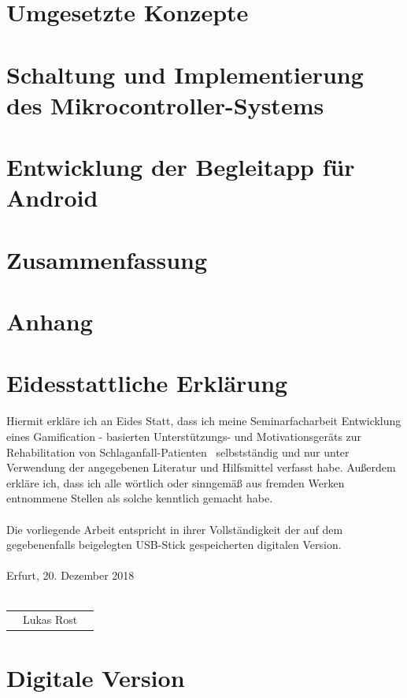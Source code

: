 \documentclass[a4paper, 11pt, titlepage, bibliography=totocnumbered]{scrartcl}
\begin{document}
\newpage
\section{Umgesetzte Konzepte}


\newpage
\section{Schaltung und Implementierung des Mikrocontroller-Systems}


\newpage
\section{Entwicklung der Begleitapp für Android}


\newpage
\section{Zusammenfassung}


\newpage


\newpage
\section{Anhang}


\newpage
\section*{Eidesstattliche Erklärung}
Hiermit erkläre ich an Eides Statt, dass ich meine Seminarfacharbeit \glqq Entwicklung eines Gamification - basierten Unterstützungs- und Motivationsgeräts zur Rehabilitation von Schlaganfall-Patienten\grqq ~ selbstständig und nur unter Verwendung der angegebenen Literatur und Hilfsmittel verfasst habe. Außerdem erkläre ich, dass ich alle wörtlich oder sinngemäß aus fremden Werken entnommene Stellen als solche kenntlich gemacht habe.\\ \\
Die vorliegende Arbeit entspricht in ihrer Vollständigkeit der auf dem gegebenenfalls beigelegten USB-Stick gespeicherten digitalen Version.
\\ \\
Erfurt, 20. Dezember 2018
\\ \\
\begin{center}
\begin{tabular}{@{}l@{}}\hline
$\: \: \:$ Lukas Rost $\: \: \:$
\end{tabular}
\end{center}

\newpage
\section*{Digitale Version}
\vspace{2cm}
\hspace{0.5cm}
\end{document}
